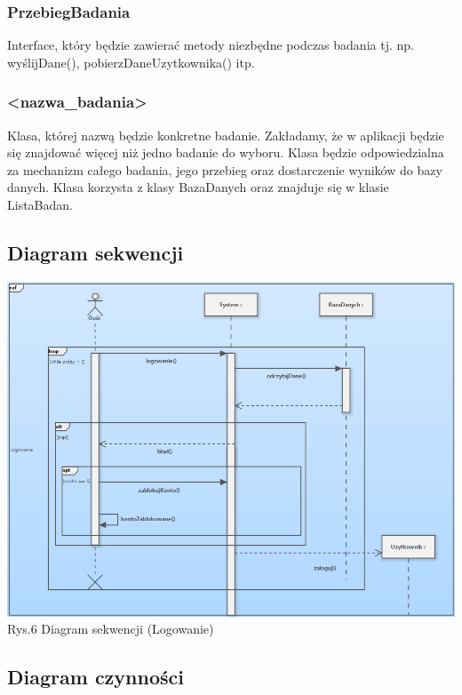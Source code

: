 \documentclass[12pt, letterpaper]{article}
\begin{document}
		\subsubsection{PrzebiegBadania}
		
		Interface, który będzie zawierać metody niezbędne podczas badania tj. np. wyślijDane(), pobierzDaneUzytkownika() itp.
		
		\subsubsection{<nazwa\_badania>}
		
		Klasa, której nazwą będzie konkretne badanie. Zakładamy, że w aplikacji będzie się znajdować więcej niż jedno badanie do wyboru. Klasa będzie odpowiedzialna za mechanizm całego badania, jego przebieg oraz dostarczenie wyników do bazy danych. Klasa korzysta z klasy BazaDanych oraz znajduje się w klasie ListaBadan.
		
		
		\subsection{Diagram sekwencji}
		
		\begin{center}
			\includegraphics[scale=0.6]{seqDiagram}\\
			\caption{Rys.6 Diagram sekwencji (Logowanie)}
		\end{center}
		
		\subsection{Diagram czynności}


 
\end{document}
